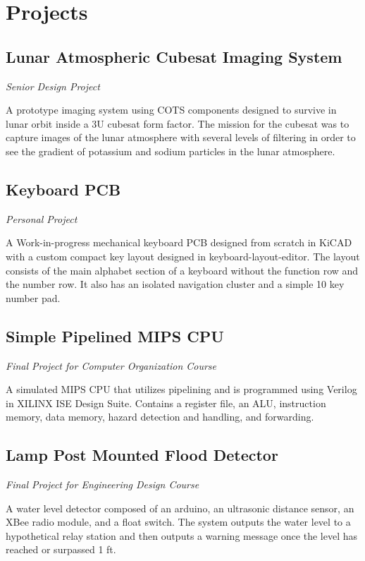 \documentclass{article}
\begin{document}
\vspace{-.75em}
\section{Projects}
\subsection{Lunar Atmospheric Cubesat Imaging System} \textit{Senior Design Project}

A prototype imaging system using COTS components designed to survive in lunar orbit inside a 3U cubesat form factor. The mission for the cubesat was to capture images of the lunar atmosphere with several levels of filtering in order to see the gradient of potassium and sodium particles in the lunar atmosphere.
\vspace{-.75em}
\subsection{Keyboard PCB} \textit{Personal Project}

A Work-in-progress mechanical keyboard PCB designed from scratch in KiCAD with a custom compact key layout designed in keyboard-layout-editor. The layout consists of the main alphabet section of a keyboard without the function row and the number row. It also has an isolated navigation cluster and a simple 10 key number pad.
\vspace{-.75em}
\subsection{Simple Pipelined MIPS CPU} \textit{Final Project for Computer Organization Course}

A simulated MIPS CPU that utilizes pipelining and is programmed using Verilog in XILINX ISE Design Suite. Contains a register file, an ALU, instruction memory, data memory, hazard detection and handling, and forwarding.
\vspace{-.75em}
\subsection{Lamp Post Mounted Flood Detector} \textit{Final Project for Engineering Design Course}

A water level detector composed of an arduino, an ultrasonic distance sensor, an XBee radio module, and a float switch. The system outputs the water level to a hypothetical relay station and then outputs a warning message once the level has reached or surpassed 1 ft.
\vspace{-.75em}
\end{document}
